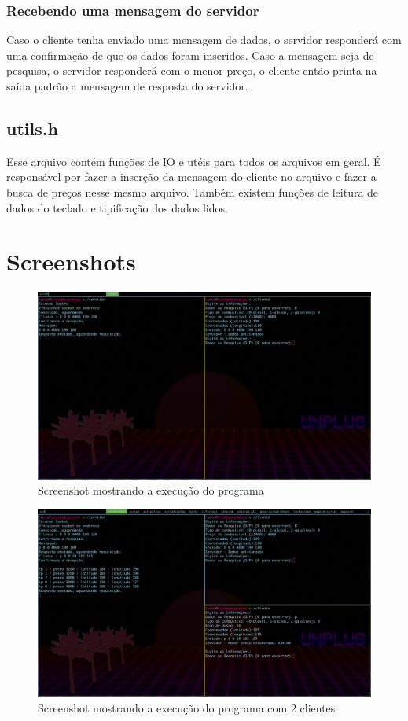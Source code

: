 \documentclass[11pt]{article}
\begin{document}
\subsubsection{Recebendo uma mensagem do servidor}
Caso o cliente tenha enviado uma mensagem de dados, o servidor responderá com uma confirmação de que os dados foram inseridos. Caso a mensagem seja de pesquisa, o servidor responderá com o menor preço, o cliente então printa na saída padrão a mensagem de resposta do servidor.

\subsection{utils.h}
Esse arquivo contém funções de IO e utéis para todos os arquivos em geral.
É responsável por fazer a inserção da mensagem do cliente no arquivo e fazer a busca de preços nesse mesmo arquivo.
Também existem funções de leitura de dados do teclado e tipificação dos dados lidos.

\section{Screenshots}

\begin{figure}[H]
    \centering
        \includegraphics[scale=.2]{scrot1-sistema-precos.png}
    \caption{Screenshot mostrando a execução do programa}
    \label{fig:1}
\end{figure}
\begin{figure}[H]
    \centering
        \includegraphics[scale=.2]{scrot2-sistema-precos.png}
    \caption{Screenshot mostrando a execução do programa com 2 clientes}
    \label{fig:1}
\end{figure}
\end{document}
